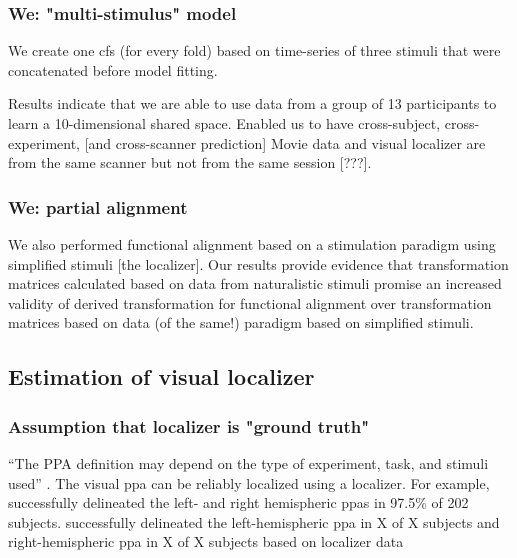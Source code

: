 \subsubsection{We: "multi-stimulus" model}

We create one \ac{cfs} (for every fold) based on time-series of three stimuli
that were concatenated before model fitting.

%
Results indicate that we are able to use data from a group of 13 participants to
learn a 10-dimensional shared space.
%
Enabled us to have cross-subject, cross-experiment, [and cross-scanner
prediction]
%
Movie data and visual localizer are from the same scanner but not from the same
session [???].


\subsubsection{We: partial alignment}


%
We also performed functional alignment based on a stimulation paradigm using
simplified stimuli [the localizer].
%
Our results provide evidence that transformation matrices calculated based on
data from naturalistic stimuli promise an increased validity of derived
transformation for functional alignment over transformation matrices based on
data (of the same!) paradigm based on simplified stimuli.



\subsection{Estimation of visual localizer}



\subsubsection{Assumption that localizer is "ground truth"}

%
``The PPA definition may depend on the type of experiment, task, and stimuli
used'' \citet{weiner2018defining}.
The visual \ac{ppa} can be reliably localized using a localizer.
%
For example, \citet{zhen2017quantifying} successfully delineated the left- and
right hemispheric \acp{ppa} in 97.5\% of 202 subjects.
\citet{sengupta2016extension} successfully delineated the left-hemispheric
\ac{ppa} in X of X subjects and right-hemispheric \ac{ppa} in X of X subjects
based on localizer data


